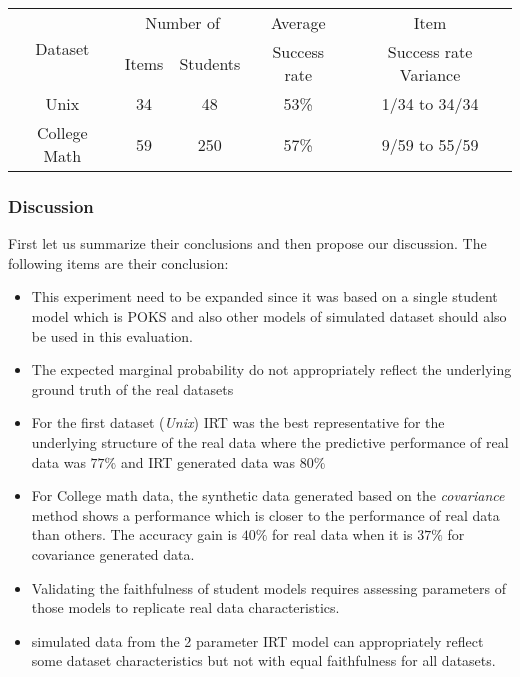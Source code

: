 \begin{center}

\begin{tabular}{|c|c|c|c|c|}
\hline 
\multirow{2}{*}{Dataset} & \multicolumn{2}{c|}{Number of} & Average & Item\tabularnewline
\cline{2-3} 
 & Items & Students & Success rate & Success rate Variance\tabularnewline
\hline 
Unix & 34 & 48 & 53\% & 1/34 to 34/34\tabularnewline
\hline 
College Math & 59 & 250 & 57\% & 9/59 to 55/59\tabularnewline
\hline 
\end{tabular}

\end{center}

\subsubsection{Discussion}

First let us summarize their conclusions and then propose our discussion. The following items are their conclusion:
\begin{itemize}
\item This experiment need to be expanded since it was based on a single student model which is POKS and also other models of simulated dataset should also be used in this evaluation.
\item The expected marginal probability do not appropriately reflect the underlying ground truth of the real datasets
\item For the first dataset (\textit{Unix}) IRT was the best representative for the underlying structure of the real data where the predictive performance of real data was $77\%$ and IRT generated data was $80\%$
\item For College math data, the synthetic data generated based on the \textit{covariance} method shows a performance which is closer to the performance of real data than others. The accuracy gain is $40\%$ for real data when it is $37\%$ for covariance generated data.

\item Validating the faithfulness of student models requires assessing parameters of those models to replicate real data characteristics.

\item simulated data from the 2 parameter IRT model can appropriately reflect some dataset characteristics but not with equal faithfulness for all datasets.
 
\end{itemize}

